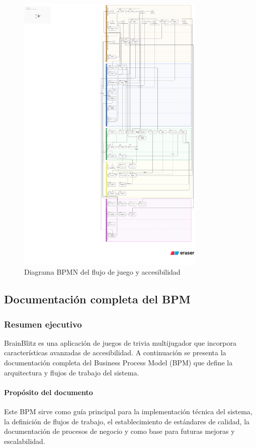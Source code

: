 \documentclass[12pt]{article}
\begin{document}
\begin{figure}[h!]
    \centering
    \includegraphics[width=0.8\textwidth]{diagrama BPMN.png}
    \caption{Diagrama BPMN del flujo de juego y accesibilidad}
\end{figure}

\subsection{Documentación completa del BPM}

\subsubsection*{Resumen ejecutivo}
BrainBlitz es una aplicación de juegos de trivia multijugador que incorpora características avanzadas de accesibilidad. A continuación se presenta la documentación completa del Business Process Model (BPM) que define la arquitectura y flujos de trabajo del sistema.

\paragraph{Propósito del documento}
Este BPM sirve como guía principal para la implementación técnica del sistema, la definición de flujos de trabajo, el establecimiento de estándares de calidad, la documentación de procesos de negocio y como base para futuras mejoras y escalabilidad.
\end{document}
